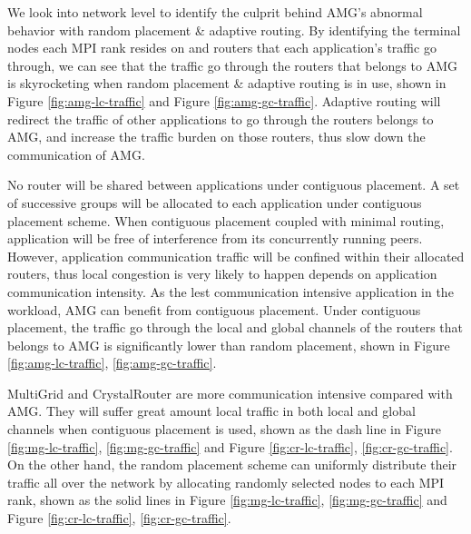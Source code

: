 \documentclass[conference,compsoc]{IEEEtran}
\begin{document}
We look into network level to identify the culprit behind AMG's abnormal behavior with random placement \& adaptive routing. By identifying the terminal nodes each MPI rank resides on and routers that each application's traffic go through, we can see that the traffic go through the routers that belongs to AMG is skyrocketing when random placement \& adaptive routing is in use, shown in Figure \ref{fig:amg-lc-traffic} and Figure \ref{fig:amg-gc-traffic}. Adaptive routing will redirect the traffic of other applications to go through the routers belongs to AMG, and increase the traffic burden on those routers, thus slow down the communication of AMG.

No router will be shared between applications under contiguous placement. A set of successive groups will be allocated to each application under contiguous placement scheme. When contiguous placement coupled with minimal routing, application will be free of interference from its concurrently running peers. However, application communication traffic will be confined within their allocated routers, thus local congestion is very likely to happen depends on application communication intensity. As the lest communication intensive application in the workload, AMG can benefit from contiguous placement. Under contiguous placement, the traffic go through the local and global channels of the routers that belongs to AMG is significantly lower than random placement, shown in Figure \ref{fig:amg-lc-traffic}, \ref{fig:amg-gc-traffic}. 

MultiGrid and CrystalRouter are more communication intensive compared with AMG. They will suffer great amount local traffic in both local and global channels when contiguous placement is used, shown as the dash line in Figure \ref{fig:mg-lc-traffic}, \ref{fig:mg-gc-traffic} and Figure \ref{fig:cr-lc-traffic}, \ref{fig:cr-gc-traffic}. On the other hand, the random placement scheme can uniformly distribute their traffic all over the network by allocating randomly selected nodes to each MPI rank, shown as the solid lines in Figure \ref{fig:mg-lc-traffic}, \ref{fig:mg-gc-traffic} and Figure \ref{fig:cr-lc-traffic}, \ref{fig:cr-gc-traffic}.
\end{document}
